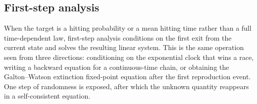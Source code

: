 \subsection{First-step analysis}\label{m:sec:first-step}

When the target is a hitting probability or a mean hitting time rather than a full
time-dependent law, first-step analysis conditions on the first exit from the
current state and solves the resulting linear system.  This is the same operation
seen from three directions: conditioning on the exponential clock that wins a
race, writing a backward equation for a continuous-time chain, or obtaining the
Galton--Watson extinction fixed-point equation after the first reproduction event.
One step of randomness is exposed, after which the unknown quantity reappears in a
self-consistent equation.
